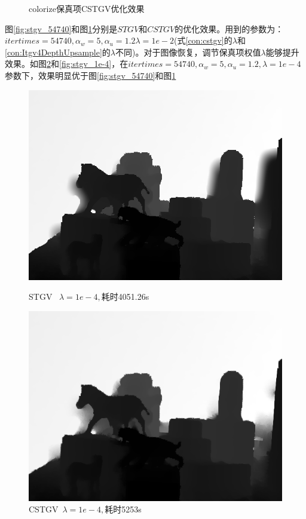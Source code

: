 \documentclass[UTF8]{ctexart}
\begin{document}
\begin{sloppypar}
\begin{figure}[htbp]
\begin{minipage}[t]{0.5\linewidth}
            \caption{\small colorize保真项CSTGV优化效果}
            \label{fig:cstgv_54740}
        \end{minipage}
    \end{figure}
    图\ref{fig:stgv_54740}和图\ref{fig:cstgv_54740}分别是$STGV$和$CSTGV$的优化效果。用到的参数为：$itertimes=54740,\alpha_w=5,\alpha_u=1.2\lambda=1e-2$(式\eqref{con:cstgv}的$\lambda$和\eqref{con:Itgv4DepthUpsample}的$\lambda$不同)。对于图像恢复，调节保真项权值$\lambda$能够提升效果。如图\ref{fig:cstgv_1e-4}和\ref{fig:stgv_1e-4}，在$itertimes=54740,\alpha_w=5,\alpha_u=1.2,\lambda=1e-4$参数下，效果明显优于图\ref{fig:stgv_54740}和图\ref{fig:cstgv_54740}
    \begin{figure}[htbp]
        \begin{minipage}[t]{0.5\linewidth}
            \centering
            \includegraphics[width=0.9\linewidth]{figure/tgvl2_iter54740_lambda1e-4}
            \caption{\small STGV \ $ \lambda=1e-4,$耗时4051.26s}
            \label{fig:stgv_1e-4}
        \end{minipage}
        \begin{minipage}[t]{0.5\linewidth}
            \centering
            \includegraphics[width=0.9\linewidth]{figure/tgvColorF_iter54740_lamda1e-4}
            \caption{\small CSTGV\ $\lambda=1e-4,$耗时5253s}
            \label{fig:cstgv_1e-4}
        \end{minipage}
    \end{figure}\par

\end{sloppypar}
\end{document}
